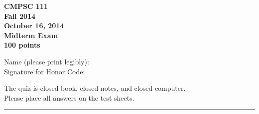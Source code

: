 \documentclass[11pt]{report}
\begin{document}
\thispagestyle{empty}
\begin{center}
\bf CMPSC 111\\
Fall 2014\\
October 16, 2014\\
Midterm Exam\\
100 points

\vspace{1in}
Name (please print legibly): \underline{\hspace{3in}}\\

\bigskip
Signature for Honor Code: \underline{\hspace{3in}}\\
\end{center}

\medskip
\noindent
The quiz is closed book, closed notes, and closed computer. \\
Please place all answers on the test sheets. 

\begin{center}\rule{4in}{1pt} \end{center}
\end{document}
